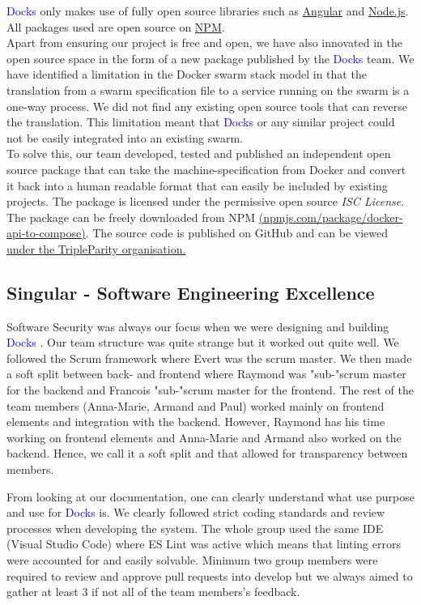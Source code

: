 \documentclass[]{article}
\newcommand{\docks}{\textcolor{Blue}{Docks} }
\newcommand{\docker}{Docker }
\begin{document}
\docks only makes use of fully open source libraries such as \href{https://github.com/angular}{Angular} and \href{https://github.com/nodejs}{Node.js}. All packages used are open source on \href{https://www.npmjs.com/}{NPM}. \\

Apart from ensuring our project is free and open, we have also innovated in the open source space in the form of a new package published by the \docks team. We have identified a limitation in the Docker swarm stack model in that the translation from a swarm specification file to a service running on the swarm is a one-way process. We did not find any existing open source tools that can reverse the translation. This limitation meant that \docks or any similar project could not be easily integrated into an existing swarm.\\
 
To solve this, our team developed, tested and published an independent open source package that can take the machine-specification from \docker and convert it back into a human readable format that can easily be included by existing projects. The package is licensed under the permissive open source \textit{ISC License}. The package can be freely downloaded from NPM \href{https://www.npmjs.com/package/docker-api-to-compose}{(npmjs.com/package/docker-api-to-compose)}. The source code is published on GitHub and can be viewed \href{https://github.com/TripleParity/docker-api-to-compose}{under the TripleParity organisation.}


\subsection{Singular - Software Engineering Excellence}
Software Security was always our focus when we were designing and building \docks.
Our team structure was quite strange but it worked out quite well. We followed the Scrum 
framework where Evert was the scrum master. We then made a soft split between back- 
and frontend where Raymond was "sub-"scrum master for the backend and Francois "sub-"scrum
master for the frontend. The rest of the team members (Anna-Marie, Armand and Paul) 
worked mainly on frontend elements and integration with the backend. However, Raymond 
has his time working on frontend elements and Anna-Marie and Armand also worked on the 
backend. Hence, we call it a soft split and that allowed for transparency between members. 

From looking at our documentation, one can clearly understand what use purpose and use 
for \docks is. We clearly followed strict coding standards and review processes when 
developing the system. The whole group used the same IDE (Visual Studio Code) where ES Lint 
was active which means that linting errors were accounted for and easily solvable. Minimum two 
group members were required to review and approve pull requests into develop but we always
aimed to gather at least 3 if not all of the team members's feedback.
\end{document}
